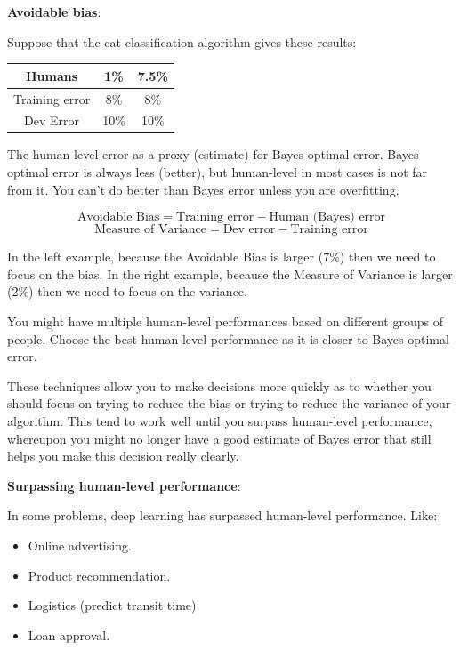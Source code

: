 \documentclass{article}
\begin{document}
\noindent \textbf{Avoidable bias}:

\noindent Suppose that the cat classification algorithm gives these results:

\begin{center}
\begin{tabular}{ |c|c|c| } 
 \hline
 Humans & 1\% & 7.5\% \\ 
 \hline
 Training error & 8\% & 8\% \\ 
 \hline
 Dev Error & 10\% & 10\%	 \\ 
 \hline
\end{tabular}
\end{center}

\noindent The human-level error as a proxy (estimate) for Bayes optimal error. Bayes optimal error is always less (better), but human-level in most cases is not far from it. You can't do better than Bayes error unless you are overfitting.

\[\text{Avoidable Bias} = \text{Training error} - \text{Human (Bayes) error}\]
\[\text{Measure of Variance} = \text{Dev error} - \text{Training error}\]

\noindent In the left example, because the Avoidable Bias is larger (7\%) then we need to focus on the bias. In the right example, because the Measure of Variance is larger (2\%) then we need to focus on the variance.

\bigskip

\noindent You might have multiple human-level performances based on different groups of people. Choose the best human-level performance as it is closer to Bayes optimal error.

\bigskip

\noindent These techniques allow you to make decisions more quickly as to whether you should focus on trying to reduce the bias or trying to reduce the variance of your algorithm. This tend to work well until you surpass human-level performance, whereupon you might no longer have a good estimate of Bayes error that still helps you make this decision really clearly.

\bigskip

\noindent \textbf{Surpassing human-level performance}:

\noindent In some problems, deep learning has surpassed human-level performance. Like:

\begin{itemize}
    \item Online advertising.
    \item Product recommendation.
    \item Logistics (predict transit time)
    \item Loan approval.
\end{itemize}
\end{document}
